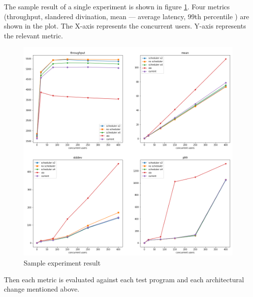 The sample result of a single experiment is shown in figure \ref{sample_result}. Four metrics (throughput, slandered divination, mean — average latency, 99th percentile  ) are shown in the plot. The X-axis represents the concurrent users. Y-axis represents the relevant metric.  

 \begin{figure}[htbp]
 	\begin{center}
 		\includegraphics[scale=0.35]{figures/prime_small test results.png}
 	\end{center}
 	\caption{Sample experiment result}
 	\label{sample_result}
 \end{figure}

Then each metric is evaluated against each test program and each architectural change mentioned above.


